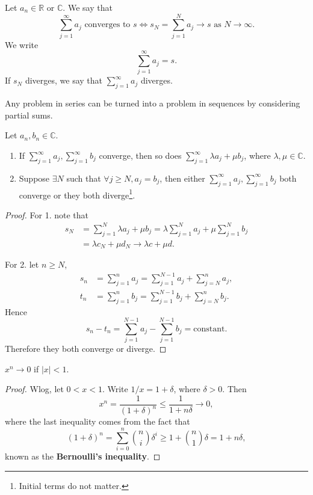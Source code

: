 \begin{definition}[Series]
    Let $ a_n\in \mathbb{R} \text{ or } \mathbb{C} $. We say that 
    \[
        \sum_{j=1}^{\infty}a_j \text{ converges to } s \Longleftrightarrow s_N = \sum_{j=1}^{N} a_j \to s \text{ as }N\to \infty.
    \]
    We write 
    \[
        \sum_{j=1}^{\infty} a_j=s.
    \]
    If $s_N$ diverges, we say that $\sum_{j=1}^{\infty} a_j$ diverges.
\end{definition}
\begin{remark}
    Any problem in series can be turned into a problem in sequences by considering partial sums.
\end{remark}

\begin{lemma}\label{lma:1.6} 
    Let $ a_n,b_n\in \mathbb{C} $.
    \begin{enumerate}
        \item If $ \sum_{j=1}^{\infty}a_j,\sum_{j=1}^{\infty}b_j$ converge, then so does $ \sum_{j=1}^{\infty}\lambda a_j+\mu b_j$, where $ \lambda,\mu\in \mathbb{C} $.
        \item Suppose $ \exists N $ such that $ \forall j\ge N, a_j=b_j $, then either $ \sum_{j=1}^{\infty}a_j,\sum_{j=1}^{\infty}b_j$ both converge or they both diverge\footnote{Initial terms do not matter.}.
    \end{enumerate}
\end{lemma}
\begin{proof}
    For 1. note that 
    \begin{align*}
        s_N &= \sum_{j=1}^{N}\lambda a_j+\mu b_j = \lambda \sum_{j=1}^{N}a_j + \mu \sum_{j=1}^{N}b_j\\ 
        &= \lambda c_N + \mu d_N \to \lambda c+ \mu d.
    \end{align*}

    For 2. let $n\ge N$,
    \begin{align*}
        s_n &= \sum_{j=1}^{n} a_j = \sum_{j=1}^{N-1}a_j+\sum_{j=N}^{n}a_j,\\ 
        t_n &= \sum_{j=1}^{n} b_j = \sum_{j=1}^{N-1}b_j+\sum_{j=N}^{n}b_j.
    \end{align*}
    Hence 
    \[
        s_n-t_n = \sum_{j=1}^{N-1}a_j-\sum_{j=1}^{N-1}b_j=\text{constant}.
    \]
    Therefore they both converge or diverge.
\end{proof}

\begin{sprop}
    $ x^n\to 0 $ if $|x|<1$.
\end{sprop}
\begin{proof}
    Wlog, let $0<x<1$. Write $ 1/x=1+\delta $, where $ \delta>0 $. Then 
    \[
        x^n = \frac{1}{(1+\delta)^n}\le \frac{1}{1+n\delta}\to 0,
    \]
    where the last inequality comes from the fact that 
    \[
        (1+\delta)^{n} = \sum_{i=0}^{n} \binom{n}{i}\delta^i\ge 1+\binom{n}{1}\delta=1+n\delta,
    \]
    known as the \textbf{Bernoulli's inequality}.
\end{proof}

